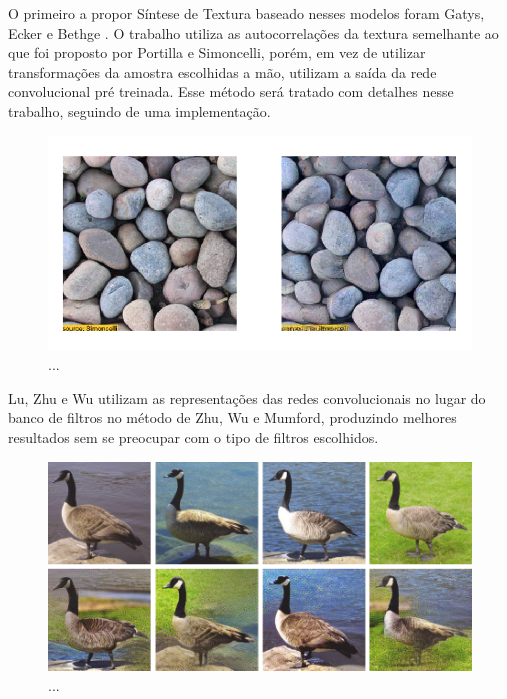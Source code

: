 
O primeiro a propor Síntese
de Textura baseado nesses modelos foram
Gatys, Ecker e Bethge \cite{Gatys2015}.
O trabalho utiliza as autocorrelações
da textura semelhante ao que foi proposto
por Portilla e Simoncelli, porém, em
vez de utilizar transformações da amostra
escolhidas a mão, utilizam a saída da
rede convolucional pré treinada. 
Esse método será tratado com detalhes
nesse trabalho, seguindo de uma implementação.

\begin{figure}[!ht]
	\centering
	\includegraphics[width=\linewidth*2/3]{files/assets/articles/gatys1.png}
	\caption{...}
	\label{img:preview}
\end{figure}


Lu, Zhu e Wu \cite{Lu2016}
utilizam as representações
das redes convolucionais
no lugar do banco de filtros
no método de Zhu, Wu e Mumford,
produzindo melhores resultados sem
se preocupar com o tipo de filtros
escolhidos.

\begin{figure}[!ht]
	\includegraphics[width=\linewidth]{files/assets/articles/lu.png}
	\caption{...}
	\label{img:preview}
\end{figure}




